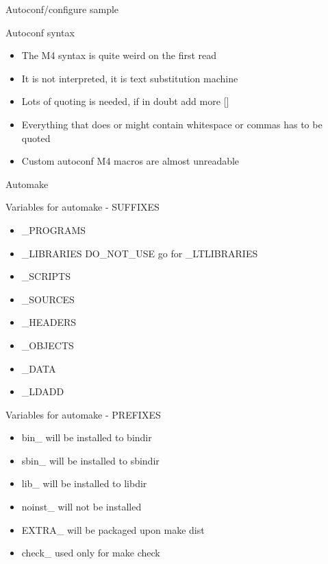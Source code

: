 \documentclass{beamer}
\begin{document}
\begin{frame}[t]{Autoconf/configure sample}
	\begin{small}
	
	\end{small}
\end{frame}

\begin{frame}{Autoconf syntax}
    \begin{itemize}
    \item The M4 syntax is quite weird on the first read
    \item It is not interpreted, it is text substitution machine
    \item Lots of quoting is needed, if in doubt add more []
    \item Everything that does or might contain whitespace or commas has to be quoted
    \item Custom autoconf M4 macros are almost unreadable
    \end{itemize}
\end{frame}

\begin{frame}[t]{Automake}
	\begin{small}
	
	\end{small}
\end{frame}

\begin{frame}{Variables for automake - SUFFIXES}
    \begin{itemize}
    \item \_PROGRAMS
    \item \_LIBRARIES DO\_NOT\_USE go for \_LTLIBRARIES
    \item \_SCRIPTS
    \item \_SOURCES
    \item \_HEADERS
    \item \_OBJECTS
    \item \_DATA
    \item \_LDADD
    \end{itemize}
\end{frame}

\begin{frame}{Variables for automake - PREFIXES}
    \begin{itemize}
    \item bin\_	will be installed to bindir
    \item sbin\_	will be installed to sbindir
    \item lib\_	will be installed to libdir
    \item noinst\_	will not be installed
    \item EXTRA\_	will be packaged upon make dist
    \item check\_	used only for make check
    \end{itemize}
\end{frame}
\end{document}
